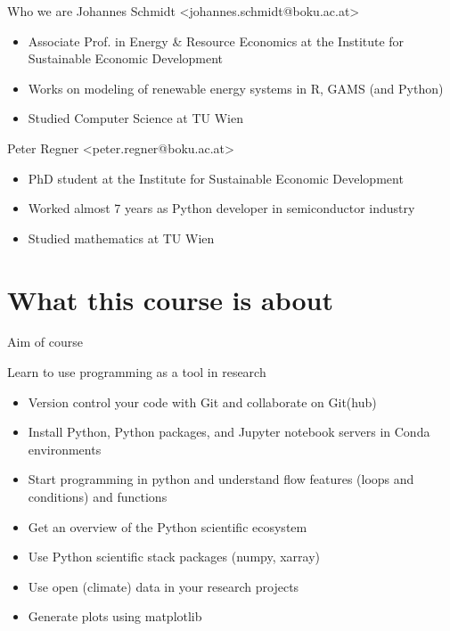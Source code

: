 \documentclass[10pt,color=usenames,dvipsnames]{beamer}
\begin{document}
\begin{frame}{Who we are}
    Johannes Schmidt <johannes.schmidt@boku.ac.at>\\
    \begin{itemize}
        \item Associate Prof. in Energy \& Resource Economics at the Institute for Sustainable Economic Development
        \item Works on modeling of renewable energy systems in R, GAMS (and Python)
        \item Studied Computer Science at TU Wien
    \end{itemize}

    \pause
    \bigskip

    Peter Regner <peter.regner@boku.ac.at>
    \begin{itemize}
        \item PhD student at the Institute for Sustainable Economic Development
        \item Worked almost 7 years as Python developer in semiconductor industry
        \item Studied mathematics at TU Wien
    \end{itemize}
\end{frame}

\section{What this course is about}

\begin{frame}{Aim of course}

	Learn to use programming as a tool in research

	\begin{itemize}
		\item Version control your code with Git and collaborate on Git(hub)
		\item Install Python, Python packages, and Jupyter notebook servers in Conda environments
		\item Start programming in python and understand flow features (loops and conditions) and functions
		\item Get an overview of the Python scientific ecosystem
		\item Use Python scientific stack packages (numpy, xarray)
		\item Use open (climate) data in your research projects
		\item Generate plots using matplotlib
	\end{itemize}

\end{frame}
\end{document}
